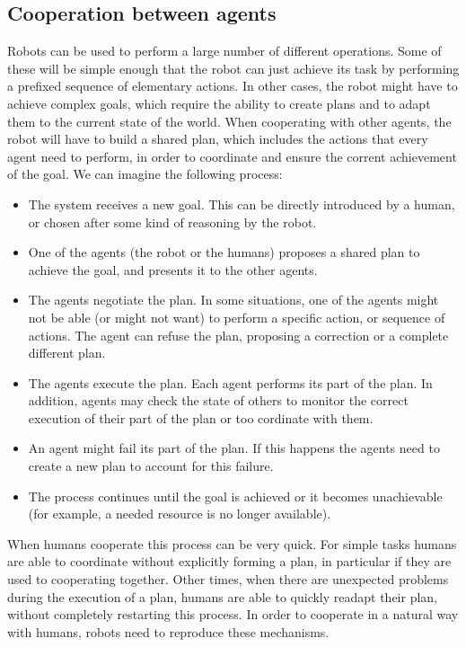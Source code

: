 \subsection{Cooperation between agents}
Robots can be used to perform a large number of different operations. Some of these will be simple enough that the robot can just achieve its task by performing a prefixed sequence of elementary actions. In other cases, the robot might have to achieve complex goals, which require the ability to create plans and to adapt them to the current state of the world. When cooperating with other agents, the robot will have to build a shared plan, which includes the actions that every agent need to perform, in order to coordinate and ensure the corrent achievement of the goal. We can imagine the following process:
\begin{itemize}
	\item The system receives a new goal. This can be directly introduced by a human, or chosen after some kind of reasoning by the robot.
	\item One of the agents (the robot or the humans) proposes a shared plan to achieve the goal, and presents it to the other agents.
	\item The agents negotiate the plan. In some situations, one of the agents might not be able (or might not want) to perform a specific action, or sequence of actions. The agent can refuse the plan, proposing a correction or a complete different plan.
	\item The agents execute the plan. Each agent performs its part of the plan. In addition, agents may check the state of others to monitor the correct execution of their part of the plan or too cordinate with them.
	\item An agent might fail its part of the plan. If this happens the agents need to create a new plan to account for this failure.
 	\item The process continues until the goal is achieved or it becomes unachievable (for example, a needed resource is no longer available).
\end{itemize} 
When humans cooperate this process can be very quick. For simple tasks humans are able to coordinate without explicitly forming a plan, in particular if they are used to cooperating together. Other times, when there are unexpected problems during the execution of a plan, humans are able to quickly readapt their plan, without completely restarting this process. In order to cooperate in a natural way with humans, robots need to reproduce these mechanisms.

